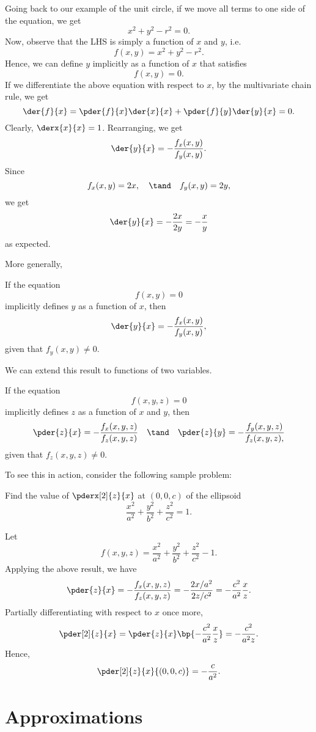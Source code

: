 Going back to our example of the unit circle, if we move all terms to one side of the equation, we get \[x^2 + y^2 - r^2 = 0.\] Now, observe that the LHS is simply a function of $x$ and $y$, i.e. \[f(x, y) = x^2 + y^2 - r^2.\] Hence, we can define $y$ implicitly as a function of $x$ that satisfies \[f(x, y) = 0.\] If we differentiate the above equation with respect to $x$, by the multivariate chain rule, we get \[\der{f}{x} = \pder{f}{x} \der{x}{x} + \pder{f}{y} \der{y}{x} = 0.\] Clearly, $\derx{x}{x} = 1$. Rearranging, we get \[\der{y}{x} = -\frac{f_x(x, y)}{f_y(x, y)}.\] Since \[f_x(x, y) = 2x, \quad \tand \quad f_y(x, y) = 2y,\] we get \[\der{y}{x} = -\frac{2x}{2y} = -\frac{x}{y}\] as expected. 

More generally,
\begin{proposition}
    If the equation \[f(x, y) = 0\] implicitly defines $y$ as a function of $x$, then \[\der{y}{x} = -\frac{f_x(x, y)}{f_y(x,  y)},\] given that $f_y(x, y) \neq 0$.
\end{proposition}

We can extend this result to functions of two variables.
\begin{proposition}
    If the equation \[f(x, y, z) = 0\] implicitly defines $z$ as a function of $x$ and $y$, then \[\pder{z}{x} = -\frac{f_x(x, y, z)}{f_z(x,  y, z)} \quad \tand \quad \pder{z}{y} = -\frac{f_y(x, y, z)}{f_z(x, y, z),}\] given that $f_z(x, y, z) \neq 0$.
\end{proposition}

To see this in action, consider the following sample problem:

\begin{sample}
    Find the value of $\pderx[2]{z}{x}$ at $(0, 0, c)$ of the ellipsoid \[\frac{x^2}{a^2} + \frac{y^2}{b^2} + \frac{z^2}{c^2} = 1.\]
\end{sample}
\begin{sampans}
    Let \[f(x, y, z) = \frac{x^2}{a^2} + \frac{y^2}{b^2} + \frac{z^2}{c^2} - 1.\] Applying the above result, we have \[\pder{z}{x} = -\frac{f_x(x, y, z)}{f_z(x,  y, z)} = -\frac{2x / a^2}{2z / c^2} = -\frac{c^2}{a^2} \frac{x}{z}.\] Partially differentiating with respect to $x$ once more, \[\pder[2]{z}{x} = \pder{z}{x} \bp{-\frac{c^2}{a^2} \frac{x}{z}} = -\frac{c^2}{a^2 z}.\] Hence, \[\pder[2]{z}{x}{(0, 0, c)} = -\frac{c}{a^2}.\]
\end{sampans}

\section{Approximations}

